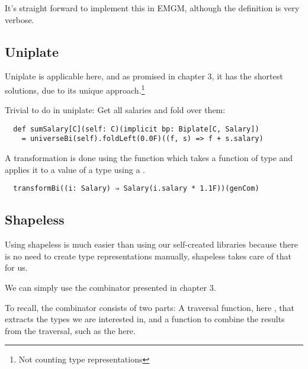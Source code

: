 \clearpage
\begin{example}
It's straight forward to implement this in EMGM, although the definition is
very verbose.

\end{example}

\subsection{Uniplate}
Uniplate is applicable here, and as promised in chapter 3, it has the shortest
solutions, due to its unique approach.\footnote{Not counting type representations}

\begin{example}
 Trivial to do in uniplate: Get all salaries and fold over them:
\begin{lstlisting}
  def sumSalary[C](self: C)(implicit bp: Biplate[C, Salary])
    = universeBi(self).foldLeft(0.0F)((f, s) => f + s.salary)
\end{lstlisting}
\end{example}

\begin{example}
 A transformation is done using the  function which takes a function of
 type  and applies it to a value of a type  using a .
\begin{lstlisting}
  transformBi((i: Salary) ⇒ Salary(i.salary * 1.1F))(genCom)
\end{lstlisting}
\end{example}


\subsection{Shapeless}

Using shapeless is much easier than using our self-created libraries because
there is no need to create type representations manually, shapeless takes care
of that for us.

\begin{example}
We can simply use the  combinator presented in chapter 3.



To recall, the  combinator consists of two parts: A traversal function,
here , that extracts the types we are interested in,
and a function to combine the results from the traversal, such as the
 here.
\end{example}

